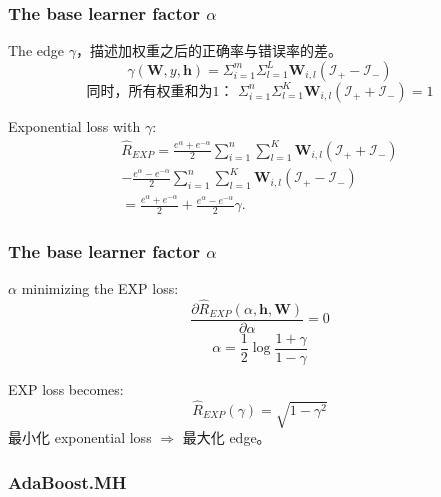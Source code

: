 \documentclass{beamer}
\begin{document}
\begin{frame}
\frametitle{The base learner factor $\alpha$}
The edge $\gamma$，描述加权重之后的正确率与错误率的差。 \\
$$ \gamma(\mathbf{W}, y, \mathbf{h}) = \Sigma_{i=1}^{m} \Sigma_{l=1}^{L} \mathbf{W}_{i,l} (\mathcal{I}_+ - \mathcal{I}_-)$$
$$\text{同时，所有权重和为1： } \Sigma_{i=1}^{n} \Sigma_{l=1}^{K}\mathbf{W}_{i,l}(\mathcal{I}_+ + \mathcal{I}_-) = 1$$
\begin{block}{Exponential loss with $\gamma$:}
$$ \begin{array}{c}
\hat{R}_{EXP} = \frac{e^\alpha + e^{-\alpha}}{2}\sum_{i=1}^{n} \sum_{l=1}^{K}\mathbf{W}_{i,l}(\mathcal{I}_+ + \mathcal{I}_-) \\
 - \frac{e^\alpha - e^{-\alpha}}{2}\sum_{i=1}^{n}\sum_{l=1}^{K}\mathbf{W}_{i,l}(\mathcal{I}_+ - \mathcal{I}_-) \\
 = \frac{e^\alpha + e^{-\alpha}}{2} + \frac{e^\alpha - e^{-\alpha}}{2}\gamma.
\end{array} $$
\end{block}
\end{frame}


\begin{frame}
\frametitle{The base learner factor $\alpha$}
\begin{block}{$\alpha$ minimizing the EXP loss:}
$$\frac{\partial \hat{R}_{EXP}(\alpha, \mathbf{h}, \mathbf{W})}{\partial \alpha} = 0$$
$$\alpha = \frac{1}{2} \log \frac{1+\gamma}{1-\gamma}$$
\end{block}

\pause

\begin{block}{EXP loss becomes:}
$$\hat{R}_{EXP}(\gamma) = \sqrt{1 - \gamma^2}$$
最小化 exponential loss $\Rightarrow$ 最大化 edge。
\end{block}

\end{frame}

\begin{frame}
\frametitle{AdaBoost.MH}
\begin{algorithm}[H]
\end{algorithm}
\end{frame}
\end{document}
